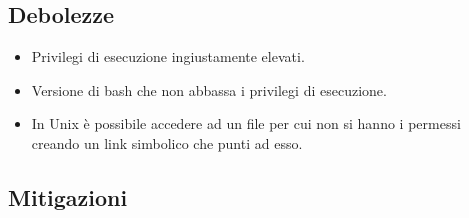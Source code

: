 \subsection{Debolezze}
\begin{itemize}
    \item Privilegi di esecuzione ingiustamente elevati.
    \item Versione di bash che non abbassa i privilegi di esecuzione.
    \item In Unix è possibile accedere ad un file per cui non si hanno i permessi creando un link simbolico che punti ad esso.
\end{itemize}

\subsection{Mitigazioni}
